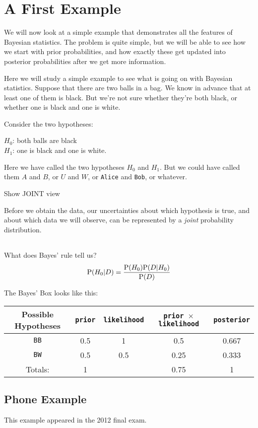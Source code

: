 \chapter{A First Example}

We will now look at a simple example that demonstrates all the features of
Bayesian statistics. The problem is quite simple, but we will be able to see
how we start with prior probabilities, and how exactly these get updated
into posterior probabilities after we get more information.


Here we will study a simple example to see what is going on with Bayesian
statistics. Suppose that there are two balls in a bag. We know in advance
that at least one of them is black. But we're not sure whether they're both
black, or whether one is black and one is white.

Consider the two hypotheses:

$H_0$: both balls are black\\
$H_1$: one is black and one is white.

Here we have called the two hypotheses $H_0$ and $H_1$. But we could have
called them $A$ and $B$, or $U$ and $W$, or {\tt Alice} and {\tt Bob}, or
whatever.


Show JOINT view

Before we obtain the data, our uncertainties about which hypothesis is true,
and about which data we will observe, can be represented by a {\it joint}
probability distribution.

\begin{table}
\begin{center}
\begin{tabular}{|c|c|c|}
\hline
\hline
\end{tabular}
\end{center}
\end{table}

What does Bayes' rule tell us?
\begin{eqnarray}
\textnormal{P}(H_0 | D) = \frac{\textnormal{P}(H_0)\textnormal{P}(D|H_0)}{\textnormal{P}(D)}
\end{eqnarray}




The Bayes' Box looks like this:
\begin{table}[h!]
\begin{center}
\begin{tabular}{|c|c|c|c|c|}
\hline
{\bf Possible Hypotheses} & {\tt prior} & {\tt likelihood} &
{\tt prior $\times$ likelihood} & {\tt posterior}\\
\hline
{\tt BB} & 0.5 & 1   & 0.5  & 0.667\\
{\tt BW} & 0.5 & 0.5 & 0.25 & 0.333\\
\hline
Totals: & 1 & & 0.75 & 1\\
\hline
\end{tabular}
\end{center}
\end{table}


\section{Phone Example}
This example appeared in the 2012 final exam.


